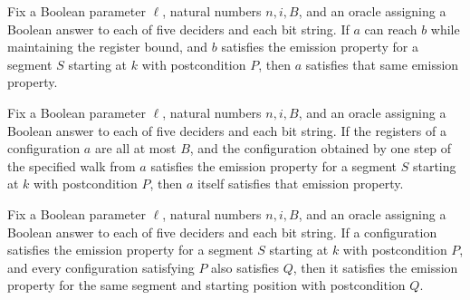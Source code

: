 \begin{lemma}
\label{BoolCircuit.AdjWalk.Em.pre}
\leanok
{}
Fix a Boolean parameter $\ell$, natural numbers $n,i,B$, and an oracle assigning a
Boolean answer to each of five deciders and each bit string. If $a$ can reach $b$ while
maintaining the register bound, and $b$ satisfies the emission property for a segment
$S$ starting at $k$ with postcondition $P$, then $a$ satisfies that same emission
property.
\end{lemma}

\begin{lemma}
\label{BoolCircuit.AdjWalk.Em.step}
\leanok
{}
Fix a Boolean parameter $\ell$, natural numbers $n,i,B$, and an oracle assigning a
Boolean answer to each of five deciders and each bit string. If the registers of a
configuration $a$ are all at most $B$, and the configuration obtained by one step of the
specified walk from $a$ satisfies the emission property for a segment $S$ starting at
$k$ with postcondition $P$, then $a$ itself satisfies that emission property.
\end{lemma}

\begin{lemma}
\label{BoolCircuit.AdjWalk.Em.mono}
\leanok
{}
Fix a Boolean parameter $\ell$, natural numbers $n,i,B$, and an oracle assigning a
Boolean answer to each of five deciders and each bit string. If a configuration
satisfies the emission property for a segment $S$ starting at $k$ with postcondition
$P$, and every configuration satisfying $P$ also satisfies $Q$, then it satisfies the
emission property for the same segment and starting position with postcondition $Q$.
\end{lemma}

